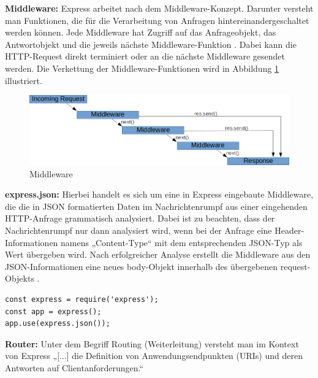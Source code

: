 \noindent
\textbf{Middleware:}
Express arbeitet nach dem Middleware-Konzept. Darunter versteht man Funktionen, die für die Verarbeitung von Anfragen hintereinandergeschaltet werden können. Jede Middleware hat Zugriff auf das Anfrageobjekt, das Antwortobjekt und die jeweils nächste Middleware-Funktion \cite{Node1.9}.
Dabei kann die HTTP-Request direkt terminiert oder an die nächste Middleware gesendet werden. Die Verkettung der Middleware-Funktionen wird in Abbildung \ref{fig:middleware} illustriert.
\newline

\begin{figure}[tbt]
\centering
\includegraphics[width=12cm]{images/nodejs_middleware.png}
\caption[Middleware]{Middleware \cite{Node1.2}}
\label{fig:middleware}
\end{figure}

%
%

\noindent
\textbf{express.json:}
Hierbei handelt es sich um eine in Express eingebaute Middleware, die die in JSON formatierten Daten im Nachrichtenrumpf aus einer eingehenden HTTP-Anfrage grammatisch analysiert.  Dabei ist zu beachten, dass der Nachrichtenrumpf nur dann analysiert wird, wenn bei der Anfrage eine Header-Informationen namens „Content-Type“ mit dem entsprechenden JSON-Typ als Wert übergeben wird. Nach erfolgreicher Analyse erstellt die Middleware aus den JSON-Informationen eine neues body-Objekt innerhalb des übergebenen request-Objekts \cite{Node2.1}.
\newline

\begin{lstlisting}[caption=Express.json Middleware benutzen,label=lst:ExpressNutzen]
const express = require('express');
const app = express();
app.use(express.json());
\end{lstlisting}

%
%

\noindent
\textbf{Router:}
Unter dem Begriff Routing (Weiterleitung) versteht man im Kontext von Express „[...] die Definition von Anwendungsendpunkten (URIs) und deren Antworten auf Clientanforderungen.“ \cite{Node2.15}
\newline

